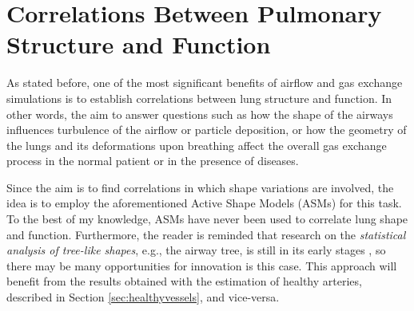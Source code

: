 \section{Correlations Between Pulmonary Structure and Function}

\challenge

As stated before, one of the most significant benefits of airflow and gas exchange simulations is to establish correlations between lung structure and function. In other words, the aim to answer questions such as how the shape of the airways influences turbulence of the airflow or particle deposition, or how the geometry of the lungs and its deformations upon breathing affect the overall gas exchange process in the normal patient or in the presence of diseases. 

\approach

Since the aim is to find correlations in which shape variations are involved, the idea is to employ the aforementioned Active Shape Models (ASMs) \citep{Cootes} for this task. To the best of my knowledge, ASMs have never been used to correlate lung shape and function. Furthermore, the reader is reminded that research on the {\em statistical analysis of tree-like shapes}, e.g., the airway tree, is still in its early stages \citep{Feragen2011,Feragen2012}, so there may be many opportunities for innovation is this case. This approach will benefit from the results obtained with the estimation of healthy arteries, described in Section \ref{sec:healthyvessels}, and vice-versa.

